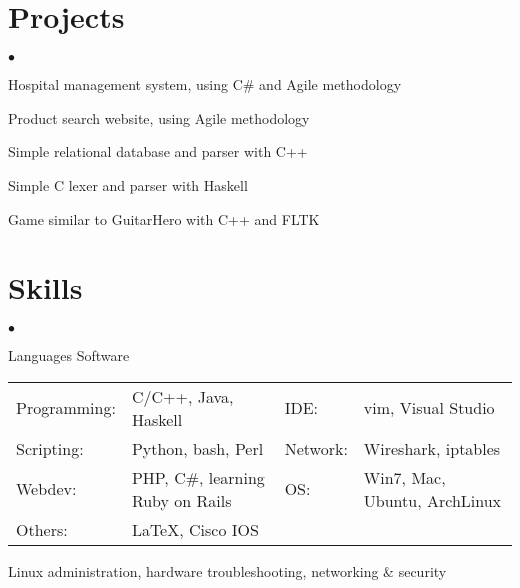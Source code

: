 \documentclass[margin,line]{res}
\newenvironment{list1}{
  \begin{list}{\ding{113}}{%
      \setlength{\itemsep}{0in}
      \setlength{\parsep}{0in} \setlength{\parskip}{0in}
      \setlength{\topsep}{0in} \setlength{\partopsep}{0in} 
      \setlength{\leftmargin}{0.17in}}}{\end{list}}
\newenvironment{list2}{
  \begin{list}{$\bullet$}{%
      \setlength{\itemsep}{0in}
      \setlength{\parsep}{0in} \setlength{\parskip}{0in}
      \setlength{\topsep}{0in} \setlength{\partopsep}{0in} 
      \setlength{\leftmargin}{0.2in}}}{\end{list}}
\begin{document}
\begin{resume}
\begin{list1}
\end{list1}

%
%
\section{\sc Projects}
\begin{list2}
\item Hospital management system, using C\# and Agile methodology
\item Product search website, using Agile methodology
\item Simple relational database and parser with C++
\item Simple C lexer and parser with Haskell
\item Game similar to GuitarHero with C++ and FLTK
\end{list2}


%
%
\section{\sc Skills} 
\begin{list2}
\item Languages \hspace{2.51in} Software\\
  \begin{tabular}{@{}p{0.9in}p{2in}p{0.5in}p{4in}}
  Programming:   & C/C++, Java, Haskell                 & IDE:        & vim, Visual Studio \\
  Scripting:     & Python, bash, Perl                   & Network:    & Wireshark, iptables \\
  Webdev:        & PHP, C\#, learning Ruby on Rails     & OS:         & Win7, Mac, Ubuntu, ArchLinux\\
  Others:        & \LaTeX, Cisco IOS                    & &
  \end{tabular}
\item Linux administration, hardware troubleshooting, networking \& security
\end{list2}



\end{resume}
\end{document}

